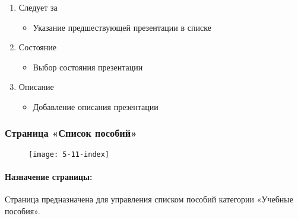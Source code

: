 \begin{enumerate}
\begin{enumerate}
\begin{enumerate}
			\item Следует за
			\begin{itemize}
				\item Указание предшествующей презентации в списке
			\end{itemize}

			\item Состояние
			\begin{itemize}
				\item Выбор состояния презентации
			\end{itemize}

			\item Описание
			\begin{itemize}
				\item Добавление описания презентации
			\end{itemize}


		\end{enumerate}
	\end{enumerate}
\end{enumerate}


\subsubsection{Страница «Список пособий»}
\begin{figure}[H]
	\texttt{[image: 5-11-index]}
\end{figure}
\paragraph{Назначение страницы:} Страница предназначена для управления списком пособий категории «Учебные пособия».

